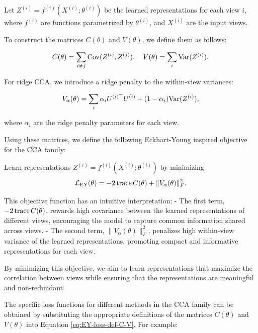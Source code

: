Let \(Z^{(i)} = f^{(i)}(X^{(i)}; \theta^{(i)})\) be the learned representations for each view \(i\), where \(f^{(i)}\) are functions parametrized by \(\theta^{(i)}\), and \(X^{(i)}\) are the input views.

To construct the matrices \(C(\theta)\) and \(V(\theta)\), we define them as follows:

\begin{align}\label{eq:def-C-V-matrices}
\vphantom{\bigl(\bigr)} %
C(\theta) = \sum_{i \neq j} \Cov(Z^{(i)}, Z^{(j)}), \quad
V(\theta) = \sum_{i} \Var(Z^{(i)}).
\end{align}

For ridge CCA, we introduce a ridge penalty to the within-view variances:

\begin{align}\label{eq:v-alpha-ridge-definition}
V_\alpha(\theta) = \sum_i \alpha_i U^{(i)\top} U^{(i)} + (1 - \alpha_i) \mathrm{Var}(Z^{(i)}),
\end{align}

where \(\alpha_i\) are the ridge penalty parameters for each view.

Using these matrices, we define the following Eckhart-Young inspired objective for the CCA family:

\begin{definition}\label{def:EY-objectives}
Learn representations \(Z^{(i)} = f^{(i)}(X^{(i)}; \theta^{(i)})\) by minimizing
\begin{align}\label{eq:EY-loss-def-C-V}
\mathcal{L}_\text{EY}(\theta) = -2 \operatorname{trace} C(\theta) + \|V_\alpha(\theta)\|_F^2.
\end{align}
\end{definition}

This objective function has an intuitive interpretation:
- The first term, \(-2 \operatorname{trace} C(\theta)\), rewards high covariance between the learned representations of different views, encouraging the model to capture common information shared across views.
- The second term, \(\|V_\alpha(\theta)\|_F^2\), penalizes high within-view variance of the learned representations, promoting compact and informative representations for each view.

By minimizing this objective, we aim to learn representations that maximize the correlation between views while ensuring that the representations are meaningful and non-redundant.

The specific loss functions for different methods in the CCA family can be obtained by substituting the appropriate definitions of the matrices \(C(\theta)\) and \(V(\theta)\) into Equation \eqref{eq:EY-loss-def-C-V}. For example:

